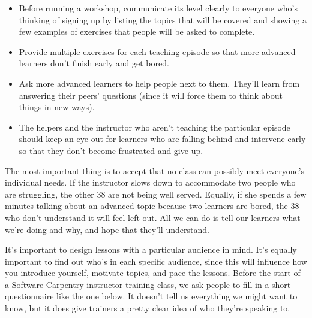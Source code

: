 \documentclass[10pt,statementpaper]{memoir}
\begin{document}
\begin{itemize}
\item
  Before running a workshop, communicate its level clearly to everyone
  who's thinking of signing up by listing the topics that will be
  covered and showing a few examples of exercises that people will be
  asked to complete.
\item
  Provide multiple exercises for each teaching episode so that more
  advanced learners don't finish early and get bored.
\item
  Ask more advanced learners to help people next to them. They'll learn
  from answering their peers' questions (since it will force them to
  think about things in new ways).
\item
  The helpers and the instructor who aren't teaching the particular
  episode should keep an eye out for learners who are falling behind and
  intervene early so that they don't become frustrated and give up.
\end{itemize}

The most important thing is to accept that no class can possibly meet
everyone's individual needs. If the instructor slows down to accommodate
two people who are struggling, the other 38 are not being well served.
Equally, if she spends a few minutes talking about an advanced topic
because two learners are bored, the 38 who don't understand it will feel
left out. All we can do is tell our learners what we're doing and why,
and hope that they'll understand.

It's important to design lessons with a particular audience in mind.
It's equally important to find out who's in each specific audience,
since this will influence how you introduce yourself, motivate topics,
and pace the lessons. Before the start of a Software Carpentry
instructor training class, we ask people to fill in a short
questionnaire like the one below. It doesn't tell us everything we might
want to know, but it does give trainers a pretty clear idea of who
they're speaking to.
\end{document}
